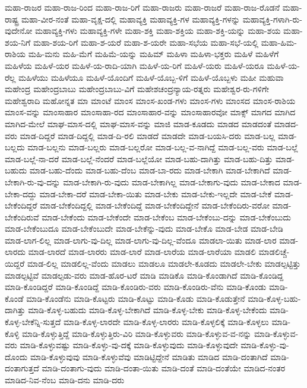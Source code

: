 {ಮಹಾ-ರಾಜರ
ಮಹಾ-ರಾಜ-ರಿಂದ
ಮಹಾ-ರಾಜ-ರಿಗೆ
ಮಹಾ-ರಾಜರು
ಮಹಾ-ರಾಜರೆ
ಮಹಾ-ರಾಜ-ರೊಡನೆ
ಮಹಾ-ರಾಷ್ಟ್ರ
ಮಹಾ-ವೀರ-ನಂತೆ
ಮಹಾ-ವೃಕ್ಷ-ದಲ್ಲಿ
ಮಹಾವ್ಯಕ್ತಿ
ಮಹಾವ್ಯಕ್ತಿ-ಗಳ
ಮಹಾವ್ಯಕ್ತಿ-ಗಳನ್ನು
ಮಹಾವ್ಯಕ್ತಿ-ಗಳಾಗಿ-ರು-ವುದೇನೋ
ಮಹಾವ್ಯಕ್ತಿ-ಗಳು
ಮಹಾವ್ಯಕ್ತಿ-ಗಳೇ
ಮಹಾ-ಶಕ್ತಿ
ಮಹಾ-ಶಕ್ತಿಯ
ಮಹಾ-ಶಕ್ತಿ-ಯನ್ನು
ಮಹಾ-ಶಯ
ಮಹಾ-ಶಯ-ನಿಗೆ
ಮಹಾ-ಶಯ-ರಿಗೆ
ಮಹಾ-ಶ-ಯರೆ
ಮಹಾ-ಶ-ಯರೇ
ಮಹಾ-ಸಭೆಯ
ಮಹಾ-ಸಭೆ-ಯಲ್ಲಿ
ಮಹಾ-ಹಿಮ-ರಾಶಿಯ
ಮಹಿ-ಮನು
ಮಹಿ-ಮೆಗೆ
ಮಹಿಮೆ-ಯನ್ನು
ಮಹಿಮ್
ಮಹಿಳಾ
ಮಹಿಳಾ-ಭಕ್ತರು
ಮಹಿಳೆ
ಮಹಿಳೆಗೆ
ಮಹಿಳೆಯ
ಮಹಿಳೆ-ಯರ
ಮಹಿಳೆ-ಯ-ರಾದಿ-ಯಾಗಿ
ಮಹಿಳೆ-ಯ-ರಿಗೆ
ಮಹಿಳೆ-ಯರು
ಮಹಿಳೆ-ಯರೂ
ಮಹಿಳೆ-ಯ-ರೆಲ್ಲ
ಮಹಿಳೆಯು
ಮಹಿಳೆಯೂ
ಮಹಿಳೆ-ಯೊಂದಿಗೆ
ಮಹಿಳೆ-ಯೊಬ್ಬ-ಳಿಗೆ
ಮಹಿಳೆ-ಯೊಬ್ಬಳು
ಮಹೀ
ಮಹುವಾ
ಮಹೇಂದ್ರ
ಮಹೇಂದ್ರಬಾಬು
ಮಹೇಂದ್ರಬಾಬು-ವಿಗೆ
ಮಹೇಶಚಂದ್ರನ್ಯಾಯ-ರತ್ನರು
ಮಹೇಶ್ವರ-ರು-ಗಳಿಗೇ
ಮಹೇಶ್ವರಾದಿ
ಮಹೋನ್ನತ
ಮಾ
ಮಾಂಟೆ
ಮಾಂಸ
ಮಾಂಸ-ಖಂಡ-ಗಳು
ಮಾಂಸ-ಗಳು
ಮಾಂಸದ
ಮಾಂಸ-ರಾಶಿಯ
ಮಾಂಸ-ವನ್ನು
ಮಾಂಸಾಹಾರ
ಮಾಂಸಾಹಾ-ರದ
ಮಾಂಸಾಹಾರ-ವನ್ನು
ಮಾಂಸಾಹಾರವೋ
ಮಾಕ್ಸ್
ಮಾಗದ
ಮಾಗಿದ
ಮಾಗಿದ-ಮೇಲೆ
ಮಾಘ-ಮಾಸ-ದಲ್ಲಿ
ಮಾಘ-ಮಾಸ-ವನ್ನು
ಮಾಜಿ
ಮಾಡ-ಕೂಡದು
ಮಾಡದ
ಮಾಡದಂತೆ
ಮಾಡದ-ವರು
ಮಾಡ-ದಿದ್ದರೆ
ಮಾಡ-ದಿದ್ದಲ್ಲಿ
ಮಾಡ-ದಿ-ರಲಿ
ಮಾಡದೆ
ಮಾಡದೇ
ಮಾಡ-ಬಯಸಿ-ದರು
ಮಾಡ-ಬಲ್ಲ
ಮಾಡ-ಬಲ್ಲದು
ಮಾಡ-ಬಲ್ಲನು
ಮಾಡ-ಬಲ್ಲರು
ಮಾಡ-ಬಲ್ಲರೋ
ಮಾಡ-ಬಲ್ಲ-ವ-ನಾಗಿದ್ದೆ
ಮಾಡ-ಬಲ್ಲ-ವರು
ಮಾಡ-ಬಲ್ಲೆ
ಮಾಡ-ಬಲ್ಲೆ-ನಾ-ದರೆ
ಮಾಡ-ಬಲ್ಲೆ-ನೆಂದರೆ
ಮಾಡ-ಬಲ್ಲೆಯೋ
ಮಾಡ-ಬಹು-ದಾಗಿತ್ತು
ಮಾಡ-ಬಹು-ದಿತ್ತು
ಮಾಡ-ಬಹುದು
ಮಾಡ-ಬಹು-ದೆಂದು
ಮಾಡ-ಬಹು-ದೆಂಬ
ಮಾಡ-ಬಾ-ರದು
ಮಾಡ-ಬೇಕಾಗಿ
ಮಾಡ-ಬೇಕಾಗಿದೆ
ಮಾಡ-ಬೇಕಾಗಿ-ರು-ವು-ದನ್ನು
ಮಾಡ-ಬೇಕಾಗಿ-ರು-ವುದು
ಮಾಡ-ಬೇಕಾಗಿಲ್ಲ
ಮಾಡ-ಬೇಕಾಗು-ವುದು
ಮಾಡ-ಬೇಕಾದ
ಮಾಡ-ಬೇಕಾ-ದದ್ದು
ಮಾಡ-ಬೇಕಾ-ದರೆ
ಮಾಡ-ಬೇಕಾ-ಯಿತು
ಮಾಡ-ಬೇಕು
ಮಾಡ-ಬೇಕು-ಇಲ್ಲದೇ
ಮಾಡ-ಬೇಕೆ
ಮಾಡ-ಬೇಕೆಂದಿದ್ದರೆ
ಮಾಡ-ಬೇಕೆಂದಿದ್ದಲ್ಲಿ
ಮಾಡ-ಬೇಕೆಂದಿದ್ದೆ
ಮಾಡ-ಬೇಕೆಂದಿದ್ದೇನೆ
ಮಾಡ-ಬೇಕೆಂದಿರು-ವರೋ
ಮಾಡ-ಬೇಕೆಂದಿರುವೆ
ಮಾಡ-ಬೇಕೆಂದು
ಮಾಡ-ಬೇಕೆಂದೇ
ಮಾಡ-ಬೇಕೆಂಬ
ಮಾಡ-ಬೇಕೆಂಬು-ದನ್ನು
ಮಾಡ-ಬೇಕೆಂಬುದು
ಮಾಡ-ಬೇಕೆಂಬುದೂ
ಮಾಡ-ಬೇಕೆಂಬುದೇ
ಮಾಡ-ಬೇಕೆನ್ನು-ವುದು
ಮಾಡ-ಬೇಕೊ
ಮಾಡ-ಬೇಡ
ಮಾಡ-ಬೇಡಿ
ಮಾಡ-ಲಾಗ-ಲಿಲ್ಲ
ಮಾಡ-ಲಾಗು-ವು-ದಿಲ್ಲ
ಮಾಡ-ಲಾಗು-ವು-ದಿಲ್ಲ-ವೆಂದೂ
ಮಾಡಲಾ-ಯಿತು
ಮಾಡ-ಲಾರ
ಮಾಡ-ಲಾರದು
ಮಾಡ-ಲಾರದೆ
ಮಾಡ-ಲಾರರು
ಮಾಡ-ಲಾರೆ
ಮಾಡ-ಲಾರೆಯ
ಮಾಡ-ಲಾರೆಯಾ
ಮಾಡಲಿ
ಮಾಡಲಿಚ್ಚೆ-ಯಿದ್ದರೆ
ಮಾಡ-ಲಿಲ್ಲ
ಮಾಡಲಿಲ್ಲ-ವೆಂದು
ಮಾಡಲು
ಮಾಡಲೂ
ಮಾಡಲೇ-ಕೂಡದು
ಮಾಡಲೇ-ಬೇಕು
ಮಾಡಲ್ಪಟ್ಟಿತ್ತು
ಮಾಡಲ್ಪಟ್ಟಿವೆ
ಮಾಡಲ್ಪಡು-ವರು
ಮಾಡ-ಹೊರ-ಟರೆ
ಮಾಡಿ
ಮಾಡಿಕೊ
ಮಾಡಿ-ಕೊಂಡಾಗಿದೆ
ಮಾಡಿ-ಕೊಂಡಿದ್ದ
ಮಾಡಿ-ಕೊಂಡಿದ್ದರೆ
ಮಾಡಿ-ಕೊಂಡಿದ್ದೆ
ಮಾಡಿ-ಕೊಂಡಿರು-ವರು
ಮಾಡಿ-ಕೊಂಡಿರು-ವೆನು
ಮಾಡಿ-ಕೊಂಡು
ಮಾಡಿ-ಕೊಂಡೆ
ಮಾಡಿ-ಕೊಂಡೆನು
ಮಾಡಿ-ಕೊಟ್ಟರು
ಮಾಡಿ-ಕೊಟ್ಟು
ಮಾಡಿ-ಕೊಡು
ಮಾಡಿ-ಕೊಡುತ್ತೇನೆ
ಮಾಡಿ-ಕೊಳ್ಳ-ಬಹು-ದಾಗಿತ್ತು
ಮಾಡಿ-ಕೊಳ್ಳ-ಬಹುದು
ಮಾಡಿ-ಕೊಳ್ಳ-ಬೇಕಾಗಿದೆ
ಮಾಡಿ-ಕೊಳ್ಳ-ಬೇಕು
ಮಾಡಿ-ಕೊಳ್ಳ-ಬೇಕೆಂದು
ಮಾಡಿ-ಕೊಳ್ಳ-ಬೇಕೆನ್ನಿ-ಸುತ್ತದೆ
ಮಾಡಿ-ಕೊಳ್ಳ-ಲಾರದೇ
ಮಾಡಿ-ಕೊಳ್ಳ-ಲಾರರು
ಮಾಡಿ-ಕೊಳ್ಳಲಿಕ್ಕೆ
ಮಾಡಿ-ಕೊಳ್ಳಲು
ಮಾಡಿ-ಕೊಳ್ಳಿ
ಮಾಡಿ-ಕೊಳ್ಳುತ್ತಿದ್ದೆ
ಮಾಡಿ-ಕೊಳ್ಳುತ್ತಿರು-ವಿರಿ
ಮಾಡಿ-ಕೊಳ್ಳುವರು
ಮಾಡಿ-ಕೊಳ್ಳುವ-ವ-ನನ್ನು
ಮಾಡಿ-ಕೊಳ್ಳುವ-ವರು
ಮಾಡಿ-ಕೊಳ್ಳುವಷ್ಟು
ಮಾಡಿ-ಕೊಳ್ಳು-ವು-ದಕ್ಕೆ
ಮಾಡಿ-ಕೊಳ್ಳುವುದು
ಮಾಡಿ-ಕೊಳ್ಳುವುದೇ
ಮಾಡಿ-ಕೊಳ್ಳು-ವು-ದೊಂದು
ಮಾಡಿ-ಕೊಳ್ಳುವುವು
ಮಾಡಿ-ಕೊಳ್ಳುವೆವು
ಮಾಡಿಟ್ಟಿದ್ದೇನೆ
ಮಾಡಿತು
ಮಾಡಿದ
ಮಾಡಿ-ದಂತಾಗಿದೆ
ಮಾಡಿ-ದಂತಾಗುತ್ತದೆ
ಮಾಡಿ-ದಂತಾಗು-ವುದು
ಮಾಡಿ-ದಂತಾ-ಯಿತು
ಮಾಡಿ-ದಂತೆ
ಮಾಡಿ-ದಂತೆಯೇ
ಮಾಡಿದ-ನಂತರ
ಮಾಡಿದ-ನಿವ-ನೆಂಬ
ಮಾಡಿ-ದನು
ಮಾಡಿ-ದರು
}
